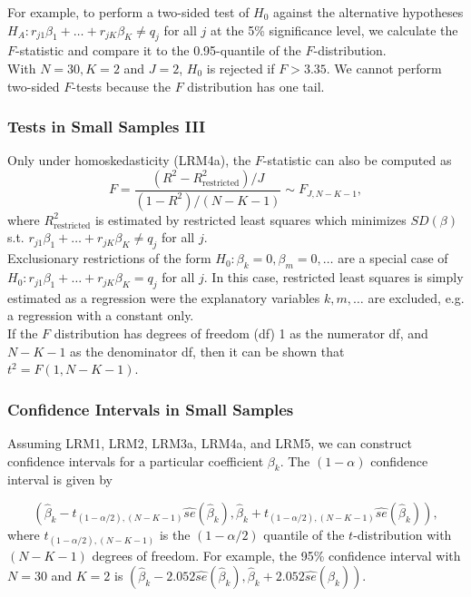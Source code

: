 \documentclass[a4paper,12pt]{article}
\begin{document}
For example, to perform a two-sided test of $H_0$ against the alternative hypotheses
$H_A: r_{j1}\beta_1 + \ldots + r_{jK}\beta_K \neq q_j$ for all $j$ at the 5\% significance level, we calculate the $F$-statistic and compare it to the 0.95-quantile of the $F$-distribution.\\[2ex] With $N = 30, K = 2$ and $J = 2$, $H_0$ is rejected if $F > 3.35$. We cannot perform two-sided $F$-tests because the $F$ distribution has one tail.



\subsubsection*{Tests in Small Samples III}


Only under homoskedasticity (LRM4a), the $F$-statistic can also be computed as
$$F = \frac{(R^2-R^2_{\text{restricted}})/J}{(1-R^2)/(N-K-1)}\sim F_{J,N-K-1},$$
where $R^2_{\text{restricted}}$ is estimated by restricted least squares which minimizes $SD(\beta)$ s.t. $r_{j1}\beta_1 +\ldots+r_{jK}\beta_K \neq q_j$ for all $j$.\\[2ex]



Exclusionary restrictions of the form $H_0: \beta_k = 0, \beta_m = 0, \ldots$ are a special case of $H_0: r_{j1}\beta_1 + \ldots + r_{jK}\beta_K = q_j$ for all $j$. In this case, restricted least squares is simply estimated as a regression were the explanatory variables $k, m, \ldots$ are excluded, e.g. a regression with a constant only.\\[2ex]
If the $F$ distribution has degrees of freedom (df) 1 as the numerator df, and $N-K-1$ as the denominator df, then it can be shown that $t^{2}=F(1,N-K-1)$.




\subsubsection*{Confidence Intervals in Small Samples}


Assuming LRM1,  LRM2,  LRM3a,  LRM4a, and  LRM5, we can construct confidence intervals for a particular coefficient $\beta_k$. The $(1-\alpha)$ confidence interval is given by

$$\left(\hat{\beta}_k-t_{(1-\alpha/2),(N-K-1)}\widehat{se}(\hat{\beta}_k), \hat{\beta}_k+t_{(1-\alpha/2),(N-K-1)}\widehat{se}(\hat{\beta}_k)\right),$$
where $t_{(1-\alpha/2),(N-K-1)}$ is the $(1 - \alpha/2)$ quantile of the $t$-distribution with $(N-K-1)$ degrees of freedom.  For example, the 95\% confidence interval with $N=30$ and $K=2$ is $\left(\hat{\beta}_k-2.052\widehat{se}(\hat{\beta}_k), \hat{\beta}_k+2.052\widehat{se}(\hat{\beta}_k)\right)$.\\[2ex]
\end{document}
